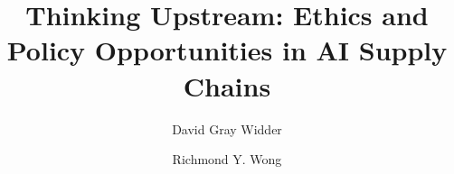 \documentclass[nonacm]{acmart}
\begin{document}
\title{Thinking Upstream: Ethics and Policy Opportunities in AI Supply Chains}


\author{David Gray Widder}

\author{Richmond Y. Wong}







\maketitle
\end{document}
